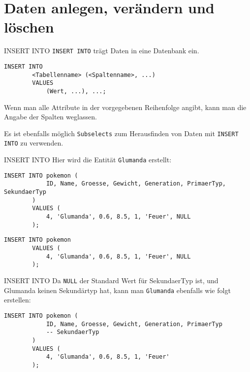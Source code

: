 \section{Daten anlegen, verändern und löschen}

\begin{sql}{INSERT INTO}
    \texttt{INSERT INTO} trägt Daten in eine Datenbank ein.

    \begin{lstlisting}[language=mysql]
        INSERT INTO
        <Tabellenname> (<Spaltenname>, ...)
        VALUES
            (Wert, ...), ...;
    \end{lstlisting}

    Wenn man alle Attribute in der vorgegebenen Reihenfolge angibt, kann man die Angabe der Spalten weglassen.

    Es ist ebenfalls möglich \texttt{Subselects} zum Herausfinden von Daten mit \texttt{INSERT INTO} zu verwenden.
\end{sql}

\begin{example}{INSERT INTO}
    Hier wird die Entität \texttt{Glumanda} erstellt:

    \begin{lstlisting}[language=mysql]
        INSERT INTO pokemon (
            ID, Name, Groesse, Gewicht, Generation, PrimaerTyp, SekundaerTyp
        )
        VALUES (
            4, 'Glumanda', 0.6, 8.5, 1, 'Feuer', NULL
        );
    \end{lstlisting}

    \begin{lstlisting}[language=mysql]
        INSERT INTO pokemon
        VALUES (
            4, 'Glumanda', 0.6, 8.5, 1, 'Feuer', NULL
        );
    \end{lstlisting}
\end{example}

\begin{example}{INSERT INTO}
    Da \texttt{NULL} der Standard Wert für SekundaerTyp ist, und Glumanda keinen Sekundärtyp hat, kann man \texttt{Glumanda} ebenfalls wie folgt erstellen:
    
    \begin{lstlisting}[language=mysql]
        INSERT INTO pokemon (
            ID, Name, Groesse, Gewicht, Generation, PrimaerTyp
            -- SekundaerTyp
        )
        VALUES (
            4, 'Glumanda', 0.6, 8.5, 1, 'Feuer'
        );
    \end{lstlisting}
\end{example}


